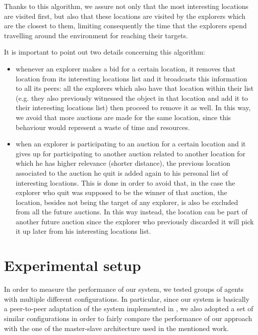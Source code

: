\documentclass[a4paper, 10pt, conference]{ieeeconf}      %
\begin{document}
Thanks to this algorithm, we assure not only that the most interesting locations are visited first, but also that these locations are visited by the explorers which are the closest to them, limiting consequently the time that the explorers spend travelling around the environment for reaching their targets. 

It is important to point out two details concerning this algorithm:
\begin{itemize}
    \item whenever an explorer makes a bid for a certain location, it removes that location from its interesting locations list and it broadcasts this information to all its peers: all the explorers which also have that location within their list (e.g. they also previously witnessed the object in that location and add it to their interesting locations list) then proceed to remove it as well. In this way, we avoid that more auctions are made for the same location, since this behaviour would represent a waste of time and resources. 
    \item when an explorer is participating to an auction for a certain location and it gives up for participating to another auction related to another location for which he has higher relevance (shorter distance), the previous location associated to the auction he quit is added again to his personal list of interesting locations. This is done in order to avoid that, in the case the explorer who quit was supposed to be the winner of that auction, the location, besides not being the target of any explorer, is also be excluded from all the future auctions. In this way instead, the location can be part of another future auction since the explorer who previously discarded it will pick it up later from his interesting locations list.
\end{itemize}


\section{Experimental setup}
In order to measure the performance of our system, we tested groups of agents with multiple different configurations. In particular, since our system is basically a peer-to-peer adaptation of the system implemented in \cite{tavaresgaspar}, we also adopted a set of similar configurations in order to fairly compare the performance of our approach with the one of the master-slave architecture used in the mentioned work. 
\end{document}
